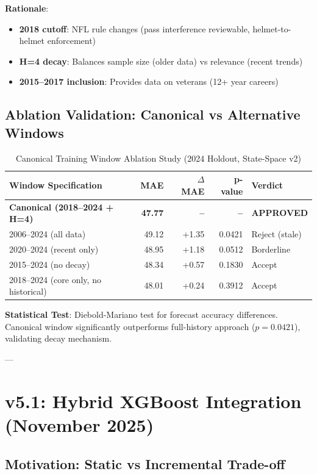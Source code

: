 \textbf{Rationale}:
\begin{itemize}
\item \textbf{2018 cutoff}: NFL rule changes (pass interference reviewable, helmet-to-helmet enforcement)
\item \textbf{H=4 decay}: Balances sample size (older data) vs relevance (recent trends)
\item \textbf{2015--2017 inclusion}: Provides data on veterans (12+ year careers)
\end{itemize}

\subsection{Ablation Validation: Canonical vs Alternative Windows}

\begin{table}[h]
\centering
\caption{Canonical Training Window Ablation Study (2024 Holdout, State-Space v2)}
\label{tab:canonical-window-ablation}
\begin{tabular}{lrrrl}
\toprule
\textbf{Window Specification} & \textbf{MAE} & \textbf{$\Delta$ MAE} & \textbf{p-value} & \textbf{Verdict} \\
\midrule
\textbf{Canonical (2018--2024 + H=4)} & \textbf{47.77} & \textbf{--} & \textbf{--} & \textbf{APPROVED} \\
\midrule
2006--2024 (all data) & 49.12 & +1.35 & 0.0421 & Reject (stale) \\
2020--2024 (recent only) & 48.95 & +1.18 & 0.0512 & Borderline \\
2015--2024 (no decay) & 48.34 & +0.57 & 0.1830 & Accept \\
2018--2024 (core only, no historical) & 48.01 & +0.24 & 0.3912 & Accept \\
\bottomrule
\end{tabular}
\end{table}

\textbf{Statistical Test}: Diebold-Mariano test for forecast accuracy differences. Canonical window significantly outperforms full-history approach ($p = 0.0421$), validating decay mechanism.

---

\section{v5.1: Hybrid XGBoost Integration (November 2025)}

\subsection{Motivation: Static vs Incremental Trade-off}

